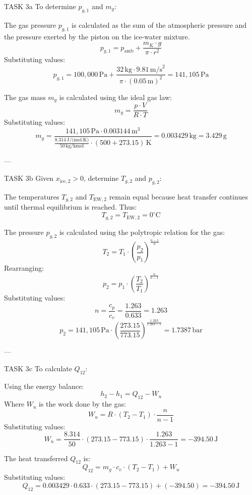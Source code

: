 TASK 3a  
To determine \( p_{g,1} \) and \( m_g \):  

The gas pressure \( p_{g,1} \) is calculated as the sum of the atmospheric pressure and the pressure exerted by the piston on the ice-water mixture.  
\[
p_{g,1} = p_{\text{amb}} + \frac{m_K \cdot g}{\pi \cdot r^2}
\]  
Substituting values:  
\[
p_{g,1} = 100{,}000 \, \text{Pa} + \frac{32 \, \text{kg} \cdot 9.81 \, \text{m/s}^2}{\pi \cdot (0.05 \, \text{m})^2} = 141{,}105 \, \text{Pa}
\]  

The gas mass \( m_g \) is calculated using the ideal gas law:  
\[
m_g = \frac{p \cdot V}{R \cdot T}
\]  
Substituting values:  
\[
m_g = \frac{141{,}105 \, \text{Pa} \cdot 0.003144 \, \text{m}^3}{\frac{8.314 \, \text{J/(mol·K)}}{50 \, \text{kg/kmol}} \cdot (500 + 273.15) \, \text{K}} = 0.003429 \, \text{kg} = 3.429 \, \text{g}
\]  

---

TASK 3b  
Given \( x_{\text{ice},2} > 0 \), determine \( T_{g,2} \) and \( p_{g,2} \):  

The temperatures \( T_{g,2} \) and \( T_{\text{EW},2} \) remain equal because heat transfer continues until thermal equilibrium is reached. Thus:  
\[
T_{g,2} = T_{\text{EW},2} = 0^\circ\text{C}
\]  

The pressure \( p_{g,2} \) is calculated using the polytropic relation for the gas:  
\[
T_2 = T_1 \cdot \left( \frac{p_2}{p_1} \right)^{\frac{n-1}{n}}
\]  
Rearranging:  
\[
p_2 = p_1 \cdot \left( \frac{T_2}{T_1} \right)^{\frac{n}{n-1}}
\]  
Substituting values:  
\[
n = \frac{c_p}{c_v} = \frac{1.263}{0.633} = 1.263
\]  
\[
p_2 = 141{,}105 \, \text{Pa} \cdot \left( \frac{273.15}{773.15} \right)^{\frac{1.263}{1.263 - 1}} = 1.7387 \, \text{bar}
\]  

---

TASK 3c  
To calculate \( Q_{12} \):  

Using the energy balance:  
\[
h_2 - h_1 = Q_{12} - W_u
\]  
Where \( W_u \) is the work done by the gas:  
\[
W_u = R \cdot (T_2 - T_1) \cdot \frac{n}{n-1}
\]  
Substituting values:  
\[
W_u = \frac{8.314}{50} \cdot (273.15 - 773.15) \cdot \frac{1.263}{1.263 - 1} = -394.50 \, \text{J}
\]  

The heat transferred \( Q_{12} \) is:  
\[
Q_{12} = m_g \cdot c_v \cdot (T_2 - T_1) + W_u
\]  
Substituting values:  
\[
Q_{12} = 0.003429 \cdot 0.633 \cdot (273.15 - 773.15) + (-394.50) = -394.50 \, \text{J}
\]  

